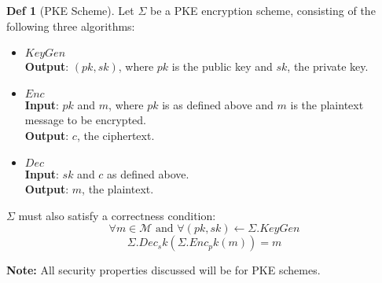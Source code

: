 \documentclass[a4paper, 10pt]{article}
\theoremstyle{definition}
\newtheorem{definition}{Def}[section]
\begin{document}
\begin{definition}[\ac{PKE} Scheme]
    Let $\Sigma$ be a \ac{PKE} encryption scheme, consisting of the following three algorithms:
    \begin{itemize}
        \item $KeyGen$\\ \textbf{Output}: $(pk, sk)$, where $pk$ is the public key and $sk$, the private key.
        \item $Enc$\\ \textbf{Input}: $pk$ and $m$, where $pk$ is as defined above and $m$ is the plaintext message to be encrypted. \\
        \textbf{Output}: $c$, the ciphertext.
        \item $Dec$\\ \textbf{Input}: $sk$ and $c$ as defined above.\\
        \textbf{Output}: $m$, the plaintext.
    \end{itemize}
    $\Sigma$ must also satisfy a correctness condition:
    \[\forall m \in \mathcal{M} \text{ and } \forall (pk, sk) \leftarrow \Sigma .KeyGen\]
    \[\Sigma .Dec_sk(\Sigma .Enc_pk(m)) = m\]
\end{definition}

\textbf{Note:} All security properties discussed will be for \ac{PKE} schemes.
\end{document}
